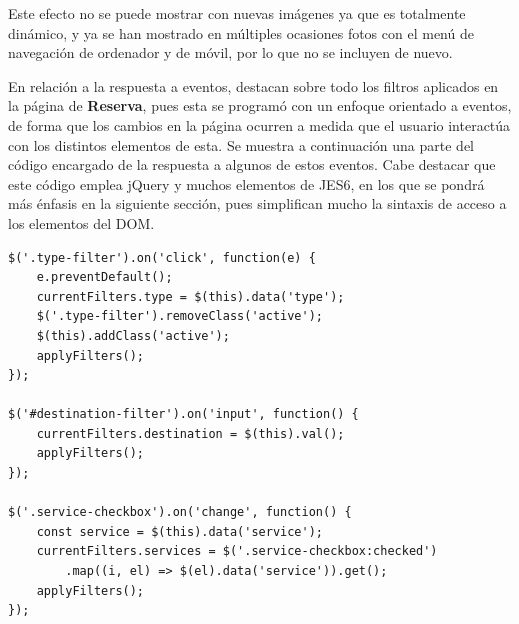\documentclass[11pt, a4paper]{book}
\begin{document}
	Este efecto no se puede mostrar con nuevas imágenes ya que es totalmente dinámico, y ya se han mostrado en múltiples ocasiones fotos con el menú de navegación de ordenador y de móvil, por lo que no se incluyen de nuevo.

    En relación a la respuesta a eventos, destacan sobre todo los filtros aplicados en la página de \textbf{Reserva}, pues esta se programó con un enfoque orientado a eventos, de forma que los cambios en la página ocurren a medida que el usuario interactúa con los distintos elementos de esta. Se muestra a continuación una parte del código encargado de la respuesta a algunos de estos eventos. Cabe destacar que este código emplea jQuery y muchos elementos de JES6, en los que se pondrá más énfasis en la siguiente sección, pues simplifican mucho la sintaxis de acceso a los elementos del DOM.

    \begin{lstlisting}
$('.type-filter').on('click', function(e) {
    e.preventDefault();
    currentFilters.type = $(this).data('type');
    $('.type-filter').removeClass('active');
    $(this).addClass('active');
    applyFilters();
});

$('#destination-filter').on('input', function() {
    currentFilters.destination = $(this).val();
    applyFilters();
});

$('.service-checkbox').on('change', function() {
    const service = $(this).data('service');
    currentFilters.services = $('.service-checkbox:checked')
        .map((i, el) => $(el).data('service')).get();
    applyFilters();
});
    \end{lstlisting}
\end{document}
